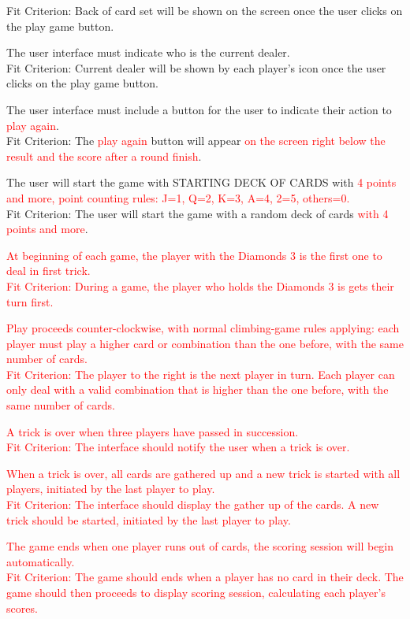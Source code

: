 \documentclass[12pt, titlepage]{article}
\begin{document}
\begin{FR}
Fit Criterion: Back of card set will be shown on the screen once the user clicks on the play game button.
\item The user interface must indicate who is the current dealer.\\
Fit Criterion: Current dealer will be shown by each player's icon once the user clicks on the play game button.
\item The user interface must include a button for the user to indicate their action to \textcolor{red}{play again}.\\
Fit Criterion: The \textcolor{red}{play again} button will appear \textcolor{red}{on the screen right below the result and the score after a round finish}.
\item The user will start the game with STARTING DECK OF CARDS with \textcolor{red}{4 points and more, point counting rules: J=1, Q=2, K=3, A=4, 2=5, others=0.}\\
Fit Criterion: The user will start the game with a random deck of cards \textcolor{red}{with 4 points and more}.
\textcolor{red}{
\item At beginning of each game, the player with the Diamonds 3 is the first one to deal in first trick.\\
Fit Criterion: During a game, the player who holds the Diamonds 3 is gets their turn first.
\item  Play proceeds counter-clockwise, with normal climbing-game rules applying: each player must play a higher card or combination than the one before, with the same number of cards.\\
Fit Criterion: The player to the right is the next player in turn. Each player can only deal with a valid combination that is higher than the one before, with the same number of cards.
\item A trick is over when three players have passed in succession.\\
Fit Criterion: The interface should notify the user when a trick is over.
\item When a trick is over, all cards are gathered up and a new trick is started with all players, initiated by the last player to play.\\
Fit Criterion: The interface should display the gather up of the cards. A new trick should be started, initiated by the last player to play.
\item The game ends when one player runs out of cards, the scoring session will begin automatically.\\
Fit Criterion: The game should ends when a player has no card in their deck. The game should then proceeds to display scoring session, calculating each player's scores.}


\end{FR}
\end{document}
